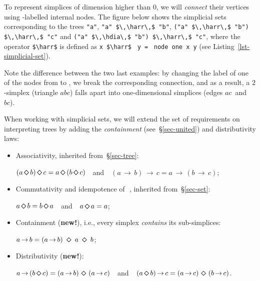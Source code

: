 \documentclass[crc,english]{programming}
\newcommand{\code}[1]{\lstinline[mathescape]|#1|}
\newcommand{\hcode}[1]{{\color{darkblue} \lstinline[keywordstyle={}]|#1|}} %
\newcommand{\hdia}{\,\text{\raisebox{-0.2mm}{\Large\color{darkblue} $\diamond$}}\,}
\newcommand{\harr}{\,\text{\color{darkblue} $\rightarrow$}\,}
\newcommand{\zero}{\raisebox{-0.2mm}{\textcircled{\textsf{0}}}\xspace}
\newcommand{\one}{\raisebox{-0.2mm}{\textcircled{\textsf{\hspace{-0.2mm}1}}}\xspace}
\newcommand{\dia}{\,\text{\raisebox{-0.3mm}{\Large $\diamond$}}\,}
\newcommand{\arr}{\,\text{$\rightarrow$}\,}
\begin{document}
To represent simplices of dimension higher than $0$, we will \emph{connect}
their vertices using \one-labelled internal nodes. The figure below shows the
simplicial sets corresponding to the trees
\code{"a"}, \code{"a" $\,\harr\,$ "b"},
\code{("a" $\,\harr\,$ "b") $\,\harr\,$ "c"} and
\code{("a" $\,\hdia\,$ "b") $\,\harr\,$ "c"}, where the operator \code{$\harr$}
is defined as \hcode{x}~\code{$\harr$}~\hcode{y}~\code{=}~\hcode{node one x y}
(see Listing~\ref{lst-simplicial-set}).

\vspace{2.5mm}
\hfill\hspace{-4mm}\hfill
\vspace{2.5mm}

\noindent
Note the difference between the two last examples: by changing the label of one
of the nodes from \one to \zero, we break the corresponding connection,
and as a result, a $2$-simplex (triangle $\textit{abc}$) falls apart into
one-dimensional simplices (edges $\textit{ac}$~and~$\textit{bc}$).

When working with simplicial sets, we will extend the set of requirements on
interpreting trees by adding the \emph{containment} (see~\S\ref{sec-united}) and
distributivity laws:

\vspace{-1mm}\begin{itemize}
    \item Associativity, inherited from~\S\ref{sec-tree}:

          \vspace{0.5mm}\hspace{10mm}$(a \dia b) \dia c = a \dia (b \dia c)$~~and~~$(a \arr b) \arr c = a \arr (b \arr c)$;

    \item Commutativity and idempotence of \dia, inherited from~\S\ref{sec-set}:

          \vspace{0.5mm}\hspace{10mm}$a \dia b = b \dia a$~~and~~$a \dia a = a$;

    \item Containment (\textbf{\color{darkblue}new!}), i.e., every simplex
          \emph{contains} its sub-simplices:

          \vspace{0.5mm}\hspace{10mm}$a \arr b = (a \arr b)\ \dia\ a\ \dia\ b$;

    \item Distributivity (\textbf{\color{darkblue}new!}):

          \vspace{0.5mm}\hspace{10mm}$a \arr (b \dia c) = (a \arr b)\,\dia\,(a \arr c)$~~and~~$(a \dia b) \arr c = (a \arr c)\,\dia\,(b \arr c)$.
\end{itemize}
\end{document}
